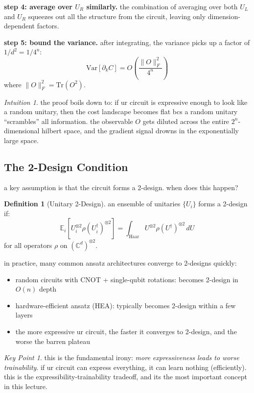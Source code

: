 \documentclass[11pt,a4paper]{article}
\theoremstyle{definition}
\newtheorem{definition}{Definition}[section]
\theoremstyle{remark}
\newtheorem*{intuition}{Intuition}
\newtheorem*{keypoint}{Key Point}
\begin{document}
\textbf{step 4: average over $U_R$ similarly.} the combination of averaging over both $U_L$ and $U_R$ squeezes out all the structure from the circuit, leaving only dimension-dependent factors.

\textbf{step 5: bound the variance.} after integrating, the variance picks up a factor of $1/d^2 = 1/4^n$:
\begin{equation}
    \text{Var}[\partial_k C] = O\left(\frac{\|O\|^2_F}{4^n}\right)
\end{equation}
where $\|O\|_F^2 = \text{Tr}(O^2)$.

\begin{intuition}
the proof boils down to: if ur circuit is expressive enough to look like a random unitary, then the cost landscape becomes flat bcs a random unitary ``scrambles'' all information. the observable $O$ gets diluted across the entire $2^n$-dimensional hilbert space, and the gradient signal drowns in the exponentially large space.
\end{intuition}

\subsection{The 2-Design Condition}

a key assumption is that the circuit forms a 2-design. when does this happen?

\begin{definition}[Unitary 2-Design]
an ensemble of unitaries $\{U_i\}$ forms a 2-design if:
\[
\mathbb{E}_i\left[U_i^{\otimes 2} \rho (U_i^\dagger)^{\otimes 2}\right] = \int_{\text{Haar}} U^{\otimes 2} \rho (U^\dagger)^{\otimes 2} \, dU
\]
for all operators $\rho$ on $(\mathbb{C}^d)^{\otimes 2}$.
\end{definition}

in practice, many common ansatz architectures converge to 2-designs quickly:
\begin{itemize}
    \item random circuits with CNOT + single-qubit rotations: becomes 2-design in $O(n)$ depth
    \item hardware-efficient ansatz (HEA): typically becomes 2-design within a few layers
    \item the more expressive ur circuit, the faster it converges to 2-design, and the worse the barren plateau
\end{itemize}

\begin{keypoint}
this is the fundamental irony: \emph{more expressiveness leads to worse trainability}. if ur circuit can express everything, it can learn nothing (efficiently). this is the expressibility-trainability tradeoff, and its the most important concept in this lecture.
\end{keypoint}
\end{document}
